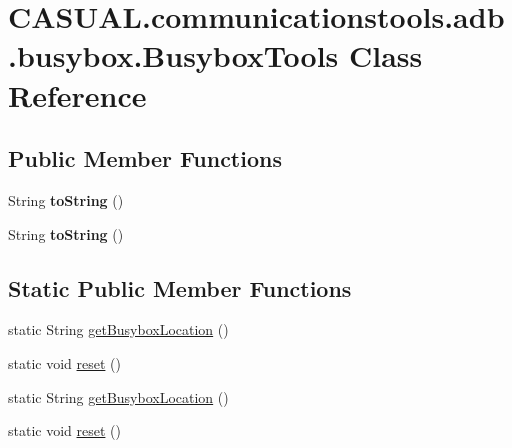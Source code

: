 \hypertarget{class_c_a_s_u_a_l_1_1communicationstools_1_1adb_1_1busybox_1_1_busybox_tools}{\section{C\-A\-S\-U\-A\-L.\-communicationstools.\-adb.\-busybox.\-Busybox\-Tools Class Reference}
\label{class_c_a_s_u_a_l_1_1communicationstools_1_1adb_1_1busybox_1_1_busybox_tools}
}
\subsection*{Public Member Functions}
\begin{DoxyCompactItemize}
\item 
\hypertarget{class_c_a_s_u_a_l_1_1communicationstools_1_1adb_1_1busybox_1_1_busybox_tools_a64dc650fed1b21a463ede713df2b8857}{String {\bfseries to\-String} ()}\label{class_c_a_s_u_a_l_1_1communicationstools_1_1adb_1_1busybox_1_1_busybox_tools_a64dc650fed1b21a463ede713df2b8857}

\item 
\hypertarget{class_c_a_s_u_a_l_1_1communicationstools_1_1adb_1_1busybox_1_1_busybox_tools_a64dc650fed1b21a463ede713df2b8857}{String {\bfseries to\-String} ()}\label{class_c_a_s_u_a_l_1_1communicationstools_1_1adb_1_1busybox_1_1_busybox_tools_a64dc650fed1b21a463ede713df2b8857}

\end{DoxyCompactItemize}
\subsection*{Static Public Member Functions}
\begin{DoxyCompactItemize}
\item 
static String \hyperlink{class_c_a_s_u_a_l_1_1communicationstools_1_1adb_1_1busybox_1_1_busybox_tools_ac2b36292ebba34dceecb282a33f9deb2}{get\-Busybox\-Location} ()
\item 
static void \hyperlink{class_c_a_s_u_a_l_1_1communicationstools_1_1adb_1_1busybox_1_1_busybox_tools_adbb81d09700a36beea382c92cbd2e8b9}{reset} ()
\item 
static String \hyperlink{class_c_a_s_u_a_l_1_1communicationstools_1_1adb_1_1busybox_1_1_busybox_tools_ac2b36292ebba34dceecb282a33f9deb2}{get\-Busybox\-Location} ()
\item 
static void \hyperlink{class_c_a_s_u_a_l_1_1communicationstools_1_1adb_1_1busybox_1_1_busybox_tools_adbb81d09700a36beea382c92cbd2e8b9}{reset} ()
\end{DoxyCompactItemize}
